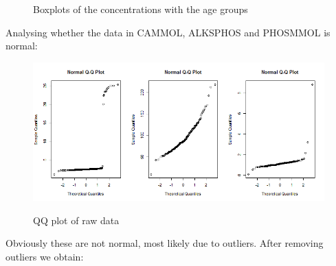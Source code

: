 \documentclass{article}
\begin{document}
\begin{figure}[H]
          \caption{Boxplots of the concentrations with the age groups}
          \label{fig:BoxAgegrp}
      \end{figure}

	Analysing whether the data in CAMMOL, ALKSPHOS and PHOSMMOL is normal:
	
	\begin{figure}[H]
		\centering
		{\includegraphics[scale=0.3]{../results/dat1_qq.png}}
		\caption{QQ plot of raw data}
		\label{fig:qq1}
	\end{figure}
	
	Obviously these are not normal, most likely due to outliers. After removing outliers we obtain:
	
\end{document}
